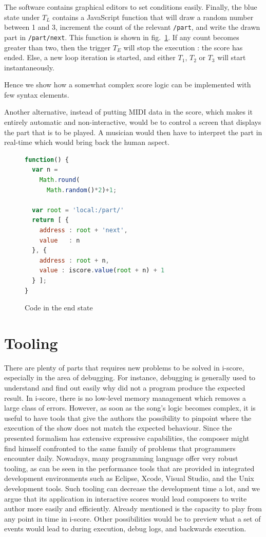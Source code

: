 \documentclass{article}
\begin{document}
The software contains graphical editors to set conditions easily.
Finally, the blue state under $T_{L}$ contains a JavaScript function 
that will draw a random number between 1 and 3, 
increment the count of the relevant \verb|/part|, 
and write the drawn part in \verb|/part/next|. 
This function is shown in fig.~\ref{fig.jsmusic}.
If any count becomes greater than two, then the
trigger $T_{E}$ will stop the execution : the score has ended. 
Else, a new loop iteration is started, and either 
$T_1$, $T_2$ or $T_3$ will start instantaneously.

Hence we show how a somewhat complex score logic 
can be implemented with few syntax elements.

Another alternative, instead of putting MIDI data in the score,
which makes it entirely automatic and non-interactive,  
would be to control a screen that displays the part that is 
to be played.
A musician would then have to interpret the part 
in real-time which would bring back the human aspect.
\begin{figure}[h]
\flushleft
\begin{lstlisting}[language=JavaScript,basicstyle=\footnotesize\ttfamily]
function() {      
  var n = 
    Math.round(
      Math.random()*2)+1;
	
  var root = 'local:/part/'
  return [ {
    address : root + 'next',
    value   : n 
  }, {
    address : root + n,
    value : iscore.value(root + n) + 1
  } ];
}
\end{lstlisting}
	\caption{Code in the end state}
	\label{fig.jsmusic}
\end{figure}
	
\section{Tooling}
There are plenty of parts that requires new problems to be solved in i-score, especially in the area of debugging. 
For instance, debugging is generally used to understand and find out easily why did not a program produce the expected result.
In i-score, there is no low-level memory management which removes a large class of errors.
However, as soon as the song's logic becomes complex, it is useful to have tools that give the authors the possibility to pinpoint where the execution of the show does not match the expected behaviour.
Since the presented formalism has extensive expressive capabilities, the composer might find himself confronted to the same family of problems that programmers encounter daily.
Nowadays, many programming language offer very robust tooling, as can be seen in the performance tools that are provided in integrated development environments such as Eclipse, Xcode, Visual Studio, and the Unix development tools\cite{spinellis2014software}.
Such tooling can decrease the development time a lot, and we argue that its application in interactive scores would lead composers to write author more easily and efficiently.
Already mentioned is the capacity to play from any point in time in i-score. 
Other possibilities would be to preview what a set of events would lead to during execution, debug logs, and backwards execution. 
\end{document}
